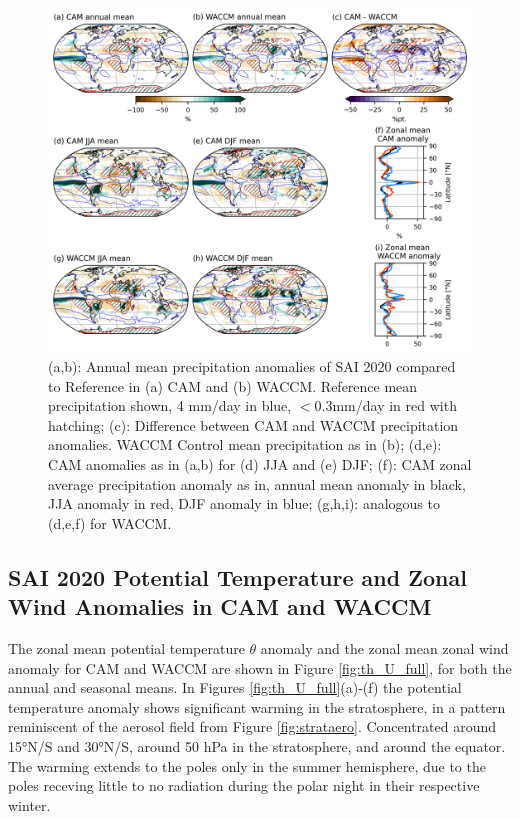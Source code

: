 \begin{figure}[H]
	\centering
	\includegraphics[width=0.95\linewidth]{images/PRECT_20ref.png}
	\caption{(a,b): Annual mean precipitation anomalies of SAI 2020 compared to Reference in (a) CAM and (b) WACCM. Reference mean precipitation shown, 4 mm/day in blue, $<0.3$mm/day in red with hatching; (c): Difference between CAM and WACCM precipitation anomalies. WACCM Control mean precipitation as in (b); (d,e): CAM anomalies as in (a,b) for (d) JJA and (e) DJF; (f): CAM zonal average precipitation anomaly as in,  annual mean anomaly in black, JJA anomaly in red, DJF anomaly in blue; (g,h,i): analogous to (d,e,f) for WACCM.}
	\label{fig:PRECT_20ref}
\end{figure}


\subsection{SAI 2020 Potential Temperature and Zonal Wind Anomalies in CAM and WACCM}\label{th_U_pt1}
The zonal mean potential temperature $\theta$ anomaly and the zonal mean zonal wind anomaly for CAM and WACCM are shown in Figure \ref{fig:th_U_full}, for both the annual and seasonal means. 
In Figures \ref{fig:th_U_full}(a)-(f) the potential temperature anomaly shows significant warming in the stratosphere, in a pattern reminiscent of the aerosol field from Figure \ref{fig:strataero}. Concentrated around 15°N/S and 30°N/S, around 50 hPa in the stratosphere, and around the equator. The warming extends to the poles only in the summer hemisphere, due to the poles receving little to no radiation during the polar night in their respective winter. 

